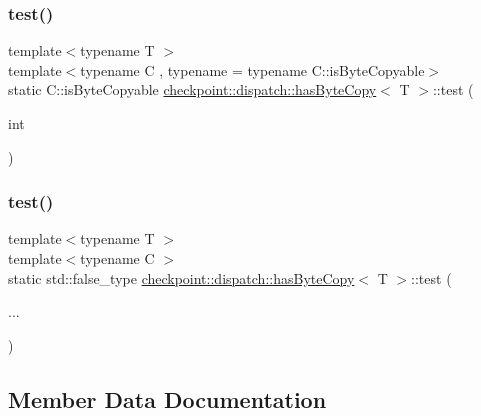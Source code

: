 \subsubsection{\texorpdfstring{test()}{test()}\hspace{0.1cm}{\footnotesize\ttfamily [1/2]}}
{\footnotesize\ttfamily template$<$typename T $>$ \\
template$<$typename C , typename  = typename C\+::is\+Byte\+Copyable$>$ \\
static C\+::is\+Byte\+Copyable \hyperlink{structcheckpoint_1_1dispatch_1_1has_byte_copy}{checkpoint\+::dispatch\+::has\+Byte\+Copy}$<$ T $>$\+::test (\begin{DoxyParamCaption}\item[{int}]{ }\end{DoxyParamCaption})\hspace{0.3cm}{\ttfamily [static]}}

\mbox{\label{structcheckpoint_1_1dispatch_1_1has_byte_copy_aa3e33afde7209de300c78bd222ac3aff}} 
\subsubsection{\texorpdfstring{test()}{test()}\hspace{0.1cm}{\footnotesize\ttfamily [2/2]}}
{\footnotesize\ttfamily template$<$typename T $>$ \\
template$<$typename C $>$ \\
static std\+::false\+\_\+type \hyperlink{structcheckpoint_1_1dispatch_1_1has_byte_copy}{checkpoint\+::dispatch\+::has\+Byte\+Copy}$<$ T $>$\+::test (\begin{DoxyParamCaption}\item[{}]{... }\end{DoxyParamCaption})\hspace{0.3cm}{\ttfamily [static]}}



\subsection{Member Data Documentation}
\mbox{\label{structcheckpoint_1_1dispatch_1_1has_byte_copy_a811d900c75ba2e9b871e18283ef493ec}} 
